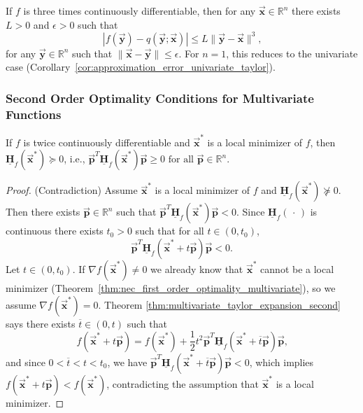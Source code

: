\documentclass[9pt, headings=standardclasses, parskip=half]{scrartcl}
\newcommand{\matr}[1]{\underline{\boldsymbol{#1}}}
\newcommand{\vect}[1]{\vec{\boldsymbol{#1}}}
\begin{document}
\begin{corollary}
\label{cor:approximation_error_multivariate_taylor_second}
If \(f\) is three times continuously differentiable, then for any \(\vect{x}\in\mathbb{R}^{n}\) there exists \(L>0\) and \(\epsilon>0\) such that
\[
\left|f(\vect{y})-q(\vect{y};\vect{x})\right|\le L\|\vect{y}-\vect{x}\|^3 \text{,}
\]
for any \(\vect{y}\in\mathbb{R}^{n}\) such that \(\|\vect{x}-\vect{y}\|\le\epsilon\). For \(n=1\), this reduces to the univariate case (Corollary~\ref{cor:approximation_error_univariate_taylor}).
\end{corollary}

\subsubsection{Second Order Optimality Conditions for Multivariate Functions}
\label{subsubsec:second_order_optimality_conditions}
\begin{theorem}
\label{thm:second_order_necessary_optimality_condition_multivariate}
If \(f\) is twice continuously differentiable and \(\vect{x}^{*}\) is a local minimizer of \(f\), then \(\matr{H}_{f}(\vect{x}^{*})\succeq 0\), i.e., \(\vect{p}^{T}\matr{H}_{f}(\vect{x}^{*})\vect{p}\ge 0 \text{ for all } \vect{p}\in\mathbb{R}^{n}\).
\end{theorem}
\begin{proof} (Contradiction)
Assume \(\vect{x}^{*}\) is a local minimizer of \(f\) and \(\matr{H}_{f}(\vect{x}^{*})\not \succeq 0\). 
Then there exists \(\vect{p}\in\mathbb{R}^{n}\) such that \(\vect{p}^{T}\matr{H}_{f}(\vect{x}^{*})\vect{p}<0\). 
Since \(\matr{H}_{f}(\, \cdot \,)\) is continuous there exists \(t_{0}>0\) such that for all \(t\in(0,t_{0})\), 
\[
\vect{p}^{T}\matr{H}_{f}(\vect{x}^{*}+t\vect{p})\vect{p}<0 \text{.}
\]
Let \(t \in (0,t_{0})\). If \(\nabla f(\vect{x}^{*}) \neq 0\) we already know that \(\vect{x}^{*}\) cannot be a local minimizer (Theorem~\ref{thm:nec_first_order_optimality_multivariate}), so we assume \(\nabla f(\vect{x}^{*}) = 0\). 
Theorem \ref{thm:multivariate_taylor_expansion_second} says there exists \(\overline{t}\in(0,t)\) such that
\[
f(\vect{x}^{*}+t\vect{p})=f(\vect{x}^{*})+\frac{1}{2}t^{2}\vect{p}^{T}\matr{H}_{f}(\vect{x}^{*}+\overline{t}\vect{p})\vect{p} \text{,}
\]
and since \(0 < \overline{t} < t < t_{0}\), we have \(\vect{p}^{T}\matr{H}_{f}(\vect{x}^{*}+\overline{t}\vect{p})\vect{p}<0\), which implies \(f(\vect{x}^{*}+t\vect{p})<f(\vect{x}^{*})\), contradicting the assumption that \(\vect{x}^{*}\) is a local minimizer.
\end{proof}
\end{document}
